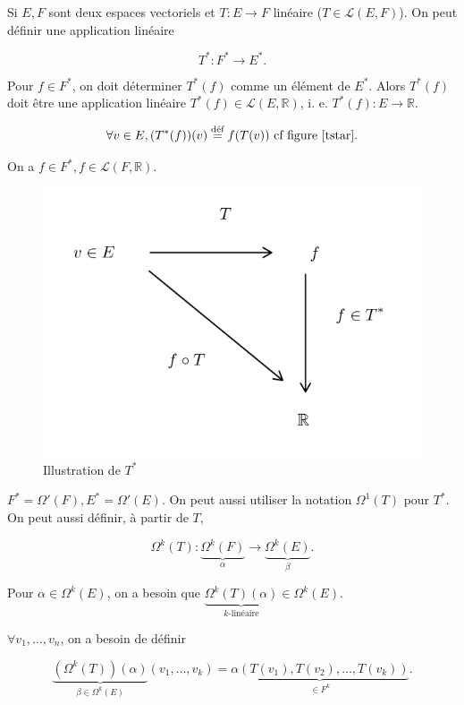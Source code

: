 \documentclass[french]{article}
\theoremstyle{definition}
\theoremstyle{remark}
\begin{document}
Si \(E, F\) sont deux espaces vectoriels et \(T : E \longrightarrow F\) linéaire (\(T \in \mathscr{L}(E, F) \)). On peut définir une application linéaire

\[T ^{*} : F ^{*} \longrightarrow E ^{*}.\]

Pour \(f \in F ^{*}\), on doit déterminer \(T ^{*}(f)\) comme un élément de \(E ^{*}\). Alors \(T ^{*}(f)\) doit être une application linéaire \(T ^{*}(f) \in \mathscr{L}(E, \mathbb{R})\), i. e. \(T ^{*}(f) : E \longrightarrow \mathbb{R}\).

\[\forall v \in E, (T ^{*}(f))(v) \stackrel{\text{déf}}{=} f(T(v)) \text{ cf figure \ref{tstar}}. \]

On a \(f \in F ^{*}, f \in \mathscr{L}(F, \mathbb{R})\).

\begin{figure}[h!]
  \centering
  \includegraphics[scale=0.3]{figures/tstar.png}
  \caption{Illustration de \(T ^{*}\)}
  \label{tstar}
\end{figure}

\(F ^{*} = \Omega'(F), E ^{*} = \Omega'(E)\). On peut aussi utiliser la notation \(\Omega ^{1}(T)\) pour \(T ^{*}\). On peut aussi définir, à partir de \(T\),

\[\Omega ^{k}(T) : \underbrace{\Omega ^{k}(F)}_{\alpha}  \longrightarrow \underbrace{\Omega ^{k}(E)}_{\beta}.\]

Pour \(\alpha \in \Omega ^{k}(E)\), on a besoin que \( \underbrace{\Omega ^{k}(T)(\alpha)}_{k\text{-linéaire}} \in \Omega ^{k}(E)\).

\(\forall v_1, \dots, v_n\), on a besoin de définir

\[ \underbrace{(\Omega ^{k}(T))(\alpha)}_{\beta \in \Omega ^{k}(E)}(v_1, \dots, v_k) = \underbrace{\alpha(T(v_1), T(v_2), \dots, T(v_k))}_{\in F ^{k}}.\]
\end{document}
